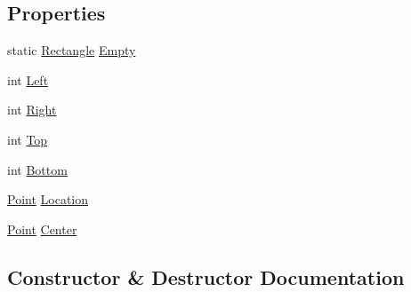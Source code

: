 \subsection*{Properties}
\begin{DoxyCompactItemize}
\item 
static \hyperlink{struct_microsoft_1_1_xna_1_1_framework_1_1_rectangle}{Rectangle} \hyperlink{struct_microsoft_1_1_xna_1_1_framework_1_1_rectangle_ad38fc4b6c41b9f7073362c6096e31872}{Empty}
\item 
int \hyperlink{struct_microsoft_1_1_xna_1_1_framework_1_1_rectangle_a5146229e70bc3afb95e8772ca31fed25}{Left}
\item 
int \hyperlink{struct_microsoft_1_1_xna_1_1_framework_1_1_rectangle_a499e8029eab83b30871ea59fec45aef6}{Right}
\item 
int \hyperlink{struct_microsoft_1_1_xna_1_1_framework_1_1_rectangle_afe76875b0b3460d71f2c78fd7fa0c520}{Top}
\item 
int \hyperlink{struct_microsoft_1_1_xna_1_1_framework_1_1_rectangle_a745e8dcde8e370b60d1816bf835548c4}{Bottom}
\item 
\hyperlink{struct_microsoft_1_1_xna_1_1_framework_1_1_point}{Point} \hyperlink{struct_microsoft_1_1_xna_1_1_framework_1_1_rectangle_a6c87f02cf75fa8bf6edc3e75c4dbcdd9}{Location}
\item 
\hyperlink{struct_microsoft_1_1_xna_1_1_framework_1_1_point}{Point} \hyperlink{struct_microsoft_1_1_xna_1_1_framework_1_1_rectangle_a942698064a1c69b7a5384787c0c0e784}{Center}
\end{DoxyCompactItemize}


\subsection{Constructor \& Destructor Documentation}
\hypertarget{struct_microsoft_1_1_xna_1_1_framework_1_1_rectangle_ad4860305cd72c200554b0db21e7baf9a}{}
